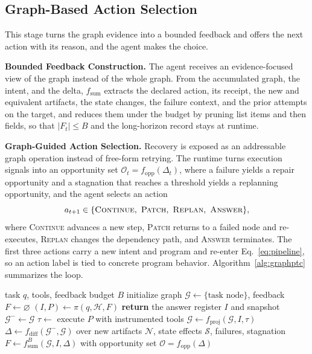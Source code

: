\subsection{Graph-Based Action Selection}
\label{sec:method-action}

This stage turns the graph evidence into a bounded feedback and offers the next action with its reason, and the agent makes the choice.

\textbf{Bounded Feedback Construction.}\quad
The agent receives an evidence-focused view of the graph instead of the whole graph.
From the accumulated graph, the intent, and the delta, $f_{\mathrm{sum}}$ extracts the declared action, its receipt, the new and equivalent artifacts, the state changes, the failure context, and the prior attempts on the target, and reduces them under the budget by pruning list items and then fields, so that $|F_t| \le B$ and the long-horizon record stays at runtime.

\textbf{Graph-Guided Action Selection.}\quad
Recovery is exposed as an addressable graph operation instead of free-form retrying.
The runtime turns execution signals into an opportunity set $\mathcal{O}_t = f_{\mathrm{opp}}(\Delta_t)$, where a failure yields a repair opportunity and a stagnation that reaches a threshold yields a replanning opportunity, and the agent selects an action
\begin{equation}
a_{t+1} \in \{\textsc{Continue},\ \textsc{Patch},\ \textsc{Replan},\ \textsc{Answer}\},
\label{eq:actions}
\end{equation}
where \textsc{Continue} advances a new step, \textsc{Patch} returns to a failed node and re-executes, \textsc{Replan} changes the dependency path, and \textsc{Answer} terminates.
The first three actions carry a new intent and program and re-enter Eq.~\ref{eq:pipeline}, so an action label is tied to concrete program behavior.
Algorithm~\ref{alg:graphptc} summarizes the loop.

\begin{algorithm}[t]
\caption{\method performs graph-guided programmatic tool calling.}
\label{alg:graphptc}
\begin{algorithmic}[1]
\REQUIRE task $q$, tools, feedback budget $B$
\STATE initialize graph $\mathcal{G} \leftarrow \{\text{task node}\}$, feedback $F \leftarrow \varnothing$
    \STATE $(I, P) \leftarrow \pi(q, \mathcal{H}, F)$ 
        \STATE \textbf{return} the answer
    \ENDIF
    \STATE register $I$ and snapshot $\mathcal{G}^{-} \leftarrow \mathcal{G}$
    \STATE $\tau \leftarrow$ execute $P$ with instrumented tools
    \STATE $\mathcal{G} \leftarrow f_{\mathrm{proj}}(\mathcal{G}, I, \tau)$ 
    \STATE $\Delta \leftarrow f_{\mathrm{diff}}(\mathcal{G}^{-}, \mathcal{G})$ over new artifacts $\mathcal{N}$, state effects $\mathcal{S}$, failures, stagnation 
    \STATE $F \leftarrow f_{\mathrm{sum}}^{B}(\mathcal{G}, I, \Delta)$ with opportunity set $\mathcal{O}=f_{\mathrm{opp}}(\Delta)$ 
\ENDWHILE
\end{algorithmic}
\end{algorithm}
